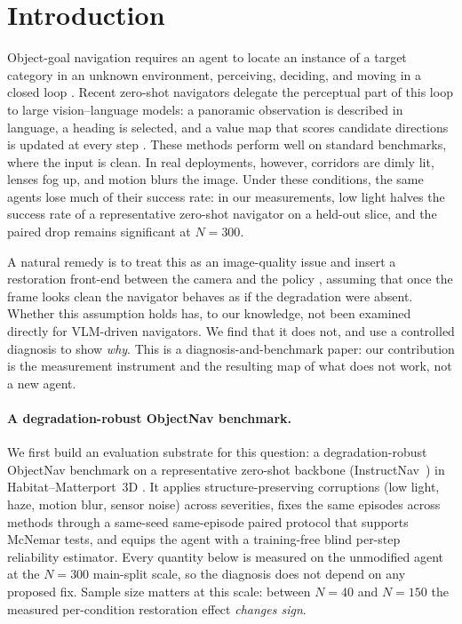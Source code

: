 \section{Introduction}

Object-goal navigation requires an agent to locate an instance of a target
category in an unknown environment, perceiving, deciding, and moving in a
closed loop \citep{batra2020objectnav}.  Recent zero-shot navigators delegate
the perceptual part of this loop to large vision--language models: a
panoramic observation is described in language, a heading is selected, and a
value map that scores candidate directions is updated at every step
\citep{long2024instructnav,yokoyama2024vlfm,zhou2023esc}. These methods perform
well on standard benchmarks, where the input is clean. In real deployments,
however, corridors are dimly lit, lenses fog up, and motion blurs the
image. Under these conditions, the same agents lose much of their success
rate: in our measurements, low light halves the success rate of a
representative zero-shot navigator on a held-out slice, and the paired
drop remains significant at $N{=}300$.

A natural remedy is to treat this as an image-quality issue and insert a
restoration front-end between the camera and the policy
\citep{guo2020zerodce,wu2023uretinex}, assuming that once the frame looks
clean  the navigator behaves as if the degradation were absent.
Whether this assumption holds has, to our knowledge, not been examined
directly for VLM-driven navigators. We find that it does not, and use a controlled
diagnosis to show \emph{why}. This is a diagnosis-and-benchmark paper: our
contribution is the measurement instrument and the resulting map of what
does not work, not a new agent.

\paragraph{A degradation-robust ObjectNav benchmark.}
We first build an evaluation substrate for this question: a degradation-robust
ObjectNav benchmark on a representative zero-shot backbone
(InstructNav~\citep{long2024instructnav}) in Habitat--Matterport~3D
\citep{ramakrishnan2021hm3d,yadav2023hm3dsem}. It applies structure-preserving
corruptions (low light, haze, motion blur, sensor noise) across severities,
fixes the same episodes across methods through a same-seed same-episode paired
protocol that supports McNemar tests, and equips the agent with a training-free
blind per-step reliability estimator. Every quantity below is measured on the
unmodified agent at the $N{=}300$ main-split scale, so the diagnosis does not
depend on any proposed fix. Sample size matters at this scale: between
$N{=}40$ and $N{=}150$ the measured per-condition restoration effect
\emph{changes sign}.

